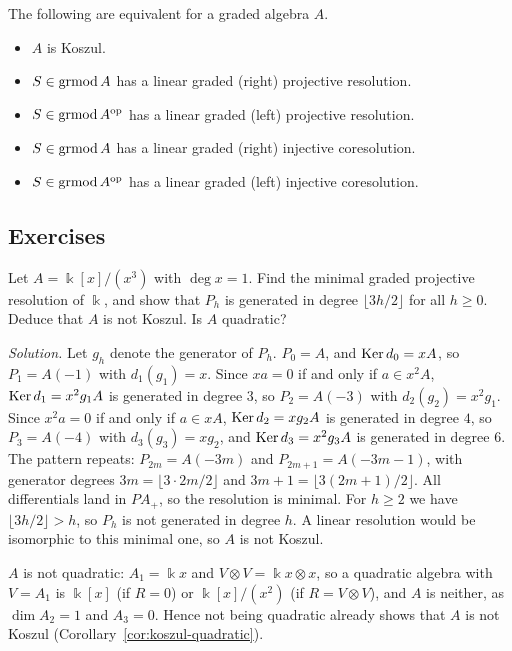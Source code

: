 \begin{corollary}
The following are equivalent for a graded algebra $A$.
\begin{itemize}
\item $A$ is Koszul.
\item $S\in \operatorname{\mathrm{grmod}} A$ has a linear graded (right) projective resolution.
\item $S\in\operatorname{\mathrm{grmod}} A^{\mathrm{op}}$ has a linear graded (left) projective resolution.
\item $S\in \operatorname{\mathrm{grmod}} A$ has a linear graded (right) injective coresolution.
\item $S\in\operatorname{\mathrm{grmod}} A^{\mathrm{op}}$ has a linear graded (left) injective coresolution.
\end{itemize}
\end{corollary}


\subsection{Exercises}

\begin{exercise}\label{ex:x-cubed}
Let $A=\Bbbk[x]/(x^3)$ with $\deg x=1$.
Find the minimal graded projective resolution of $\Bbbk$, and show that $P_h$ is generated in degree $\lfloor 3h/2\rfloor$ for all $h\geq0$.
Deduce that $A$ is not Koszul.
Is $A$ quadratic?
\end{exercise}

\begin{hidden}
\emph{Solution.}
Let $g_h$ denote the generator of $P_h$.
$P_0=A$, and $\operatorname{Ker}\nolimits d_0=xA$, so $P_1=A(-1)$ with $d_1(g_1)=x$.
Since $xa=0$ if and only if $a\in x^2A$, $\operatorname{Ker}\nolimits d_1=x^2g_1A$ is generated in degree $3$, so $P_2=A(-3)$ with $d_2(g_2)=x^2g_1$.
Since $x^2a=0$ if and only if $a\in xA$, $\operatorname{Ker}\nolimits d_2=xg_2A$ is generated in degree $4$, so $P_3=A(-4)$ with $d_3(g_3)=xg_2$, and $\operatorname{Ker}\nolimits d_3=x^2g_3A$ is generated in degree $6$.
The pattern repeats: $P_{2m}=A(-3m)$ and $P_{2m+1}=A(-3m-1)$, with generator degrees $3m=\lfloor 3\cdot2m/2\rfloor$ and $3m+1=\lfloor3(2m+1)/2\rfloor$.
All differentials land in $PA_+$, so the resolution is minimal.
For $h\geq2$ we have $\lfloor3h/2\rfloor>h$, so $P_h$ is not generated in degree $h$.
A linear resolution would be isomorphic to this minimal one, so $A$ is not Koszul.

$A$ is not quadratic: $A_1=\Bbbk x$ and $V\otimes V=\Bbbk x\otimes x$, so a quadratic algebra with $V=A_1$ is $\Bbbk[x]$ (if $R=0$) or $\Bbbk[x]/(x^2)$ (if $R=V\otimes V$), and $A$ is neither, as $\dim A_2=1$ and $A_3=0$.
Hence not being quadratic already shows that $A$ is not Koszul (Corollary~\ref{cor:koszul-quadratic}).
\end{hidden}


